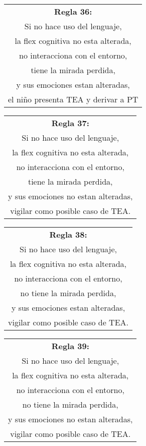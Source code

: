 \documentclass[letterpaper,12pt]{article}
\begin{document}
\begin{center}
	\begin{tabular}{|c|}
		\hline 
		\textbf{Regla 36:} \\
		Si no hace uso del lenguaje,\\
		la flex cognitiva no esta alterada,\\
		no interacciona con el entorno,\\
		tiene la mirada perdida,\\
		y sus emociones estan alteradas,\\
		el niño presenta TEA y derivar a PT\\
\hline 
\end{tabular} 
\end{center}		
		
\begin{center}
	\begin{tabular}{|c|}
		\hline 
		\textbf{Regla 37:} \\
		Si no hace uso del lenguaje,\\
		la flex cognitiva no esta alterada,\\
		no interacciona con el entorno,\\
		tiene la mirada perdida,\\
		y sus emociones no estan alteradas,\\
		vigilar como posible caso de TEA.\\
\hline 
\end{tabular} 
\end{center}		
		
\begin{center}
	\begin{tabular}{|c|}
		\hline 
		\textbf{Regla 38:} \\
		Si no hace uso del lenguaje,\\
		la flex cognitiva no esta alterada,\\
		no interacciona con el entorno,\\
		no tiene la mirada perdida,\\
		y sus emociones estan alteradas,\\
		vigilar como posible caso de TEA.\\
\hline 
\end{tabular} 
\end{center}		
		
\begin{center}
	\begin{tabular}{|c|}
		\hline 
		\textbf{Regla 39:} \\
		Si no hace uso del lenguaje,\\
		la flex cognitiva no esta alterada,\\
		no interacciona con el entorno,\\
		no tiene la mirada perdida,\\
		y sus emociones no estan alteradas,\\
		vigilar como posible caso de TEA.\\
\hline 
\end{tabular} 
\end{center}		
		
\end{document}
